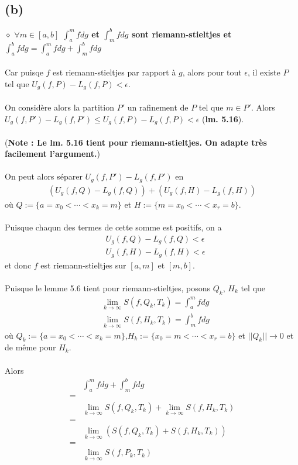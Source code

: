 \documentclass[a4paper,10pt]{article}
\begin{document}
\subsection*{(b)}
$\diamond$ \textbf{$\forall m \in [a,b]$ $\int_a^m f dg$ et $\int_m^b f dg$ sont riemann-stieltjes et $\int_a^b f dg = \int_a^m f dg + \int_m^b f dg$}
\\
\\
Car puisqe $f$ est riemann-stieltjes par rapport à $g$, alors pour tout $\epsilon$, il existe $P$ tel que $U_g(f,P) - L_g(f,P) < \epsilon$.
\\
\\
On considère alors la partition $P'$ un rafinement de $P$ tel que $m \in P'$. Alors $U_g(f,P') - L_g(f,P') \leq U_g(f,P) - L_g(f,P) < \epsilon$
(\textbf{lm. 5.16}).
\\
\\
(\textbf{Note : Le lm. 5.16 tient pour riemann-stieltjes. On adapte très facilement l'argument.})
\\
\\
On peut alors séparer $U_g(f,P') - L_g(f,P')$ en 
\begin{align*}
 (U_g(f,Q) - L_g(f,Q)) + (U_g(f,H) - L_g(f,H))
\end{align*}
où $Q := \{a = x_0 < \cdots < x_k = m\}$ et $H := \{m = x_0 < \cdots < x_r = b\}$.
\\
\\
Puisque chaqun des termes de cette somme est positifs, on a 
\begin{align*}
 & U_g(f,Q) - L_g(f,Q) < \epsilon \\
 & U_g(f,H) - L_g(f,H) < \epsilon
\end{align*}
et donc $f$ est riemann-stieltjes sur $[a,m]$ et $[m,b]$.
\\
\\
Puisque le lemme 5.6 tient pour riemann-stieltjes, posons $Q_k$, $H_k$ tel que 
\begin{align*}
 & \lim_{k \to \infty} S(f,Q_k, T_k) = \int_a^m f dg \\
 & \lim_{k \to \infty} S(f, H_k, T_k) = \int_m^b f dg
\end{align*}
où $Q_k := \{a = x_0 < \cdots < x_k = m\}$,$H_k := \{x_0 = m < \cdots < x_r = b\}$ et $||Q_k|| \rightarrow 0$ et de même pour $H_k$.
\\
\\
Alors
\begin{align*}
 & \int_a^m f dg + \int_m^b f dg \\
 = \\
 & \lim_{k \to \infty} S(f,Q_k, T_k) + \lim_{k \to \infty} S(f, H_k, T_k) \\
 = \\
 & \lim_{k \to \infty} (S(f,Q_k, T_k) + S(f, H_k, T_k)) \\
 = \\
 & \lim_{k \to \infty} S(f,P_k, T_k)
\end{align*}
\end{document}
